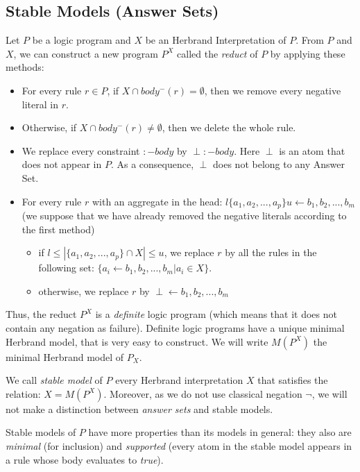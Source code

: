 \subsection{Stable Models (Answer Sets)}

Let $P$ be a logic program and $X$ be an Herbrand Interpretation of $P$. From $P$ and $X$, we can construct a new program $P^X$ called the \textit{reduct} of $P$ by applying these methods:
\begin{itemize}
\item For every rule $r\in P$, if $X\cap body^-(r)=\emptyset$, then we remove every negative literal in $r$.
\item Otherwise, if $X\cap body^-(r)\neq\emptyset$, then we delete the whole rule.
\item We replace every constraint $ :- body$ by $\perp :- body$. Here $\perp$ is an atom that does not appear in $P$. As a consequence, $\perp$ does not belong to any Answer Set.
\item For every rule $r$ with an aggregate in the head: $l\{a_1, a_2, ..., a_p\}u \leftarrow b_1, b_2, ..., b_m$ (we suppose that we have already removed the negative literals according to the first method)
\begin{itemize}
\item if $l \leq |\{a_1, a_2, ..., a_p\}\cap X | \leq u$, we replace $r$ by all the rules in the following set: $\{ a_i \leftarrow b_1, b_2, ..., b_m | a_i \in X\}$.
\item otherwise, we replace $r$ by $\perp \leftarrow b_1, b_2, ..., b_m$
\end{itemize}
\end{itemize}

Thus, the reduct $P^X$ is a \textit{definite} logic program (which means that it does not contain any negation as failure). Definite logic programs have a unique minimal Herbrand model, that is very easy to construct. We will write $M(P^X)$ the minimal Herbrand model of $P_X$.

\smallskip

We call \textit{stable model} of $P$ every Herbrand interpretation $X$ that satisfies the relation: $X=M(P^X)$. Moreover, as we do not use classical negation $\neg$, we will not make a distinction between \textit{answer sets} and stable models.

\smallskip

Stable models of $P$ have more properties than its models in general: they also are \textit{minimal} (for inclusion) and \textit{supported} (every atom in the stable model appears in a rule whose body evaluates to \textit{true}). 

